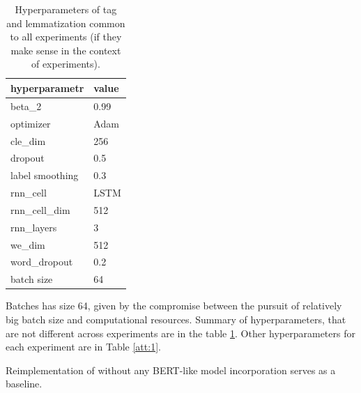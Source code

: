  \begin{table}[!h]
 \centering
\begin{tabular}{|l||l|}
\hline
hyperparametr   & \multicolumn{1}{l|}{value} \\ \hline \hline
beta\_2          & 0.99                       \\ \hline
optimizer       & Adam                       \\ \hline
cle\_dim         & 256                        \\ \hline
dropout         & 0.5                        \\ \hline
label smoothing & 0.3                        \\ \hline
rnn\_cell        & LSTM                       \\ \hline
rnn\_cell\_dim    & 512                        \\ \hline
rnn\_layers      & 3                          \\ \hline
we\_dim          & 512                        \\ \hline
word\_dropout    & 0.2                        \\ \hline
batch size & 64 \\ \hline
\end{tabular}
\caption{Hyperparameters of tag and lemmatization common to all experiments (if they make sense in the context of experiments).}
\label{tab:hyp_all}
\end{table}
Batches has size 64, given by the compromise between the pursuit of relatively big batch size and computational resources. Summary of hyperparameters, that are not different across experiments are in the table \ref{tab:hyp_all}. Other hyperparameters for each experiment are in Table \ref{att:1}.
\par 
Reimplementation of \citep{Straka2019a} without any BERT-like model incorporation serves as a baseline.

